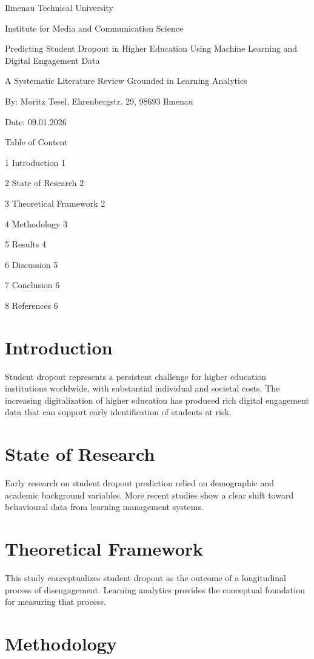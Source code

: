 \documentclass[12pt]{article}
\begin{document}
Ilmenau Technical University

Institute for Media and Communication Science

Predicting Student Dropout in Higher Education Using Machine Learning and Digital Engagement Data

A Systematic Literature Review Grounded in Learning Analytics

By: Moritz Tesel, Ehrenbergstr. 29, 98693 Ilmenau

Date: 09.01.2026


Table of Content

1 Introduction 1

2 State of Research 2

3 Theoretical Framework 2

4 Methodology 3

5 Results 4

6 Discussion 5

7 Conclusion 6

8 References 6


\section{Introduction}

Student dropout represents a persistent challenge for higher education institutions worldwide, with substantial individual and societal costs. The increasing digitalization of higher education has produced rich digital engagement data that can support early identification of students at risk.

\section{State of Research}

Early research on student dropout prediction relied on demographic and academic background variables. More recent studies show a clear shift toward behavioural data from learning management systems.

\section{Theoretical Framework}

This study conceptualizes student dropout as the outcome of a longitudinal process of disengagement. Learning analytics provides the conceptual foundation for measuring that process.

\section{Methodology}
\end{document}
